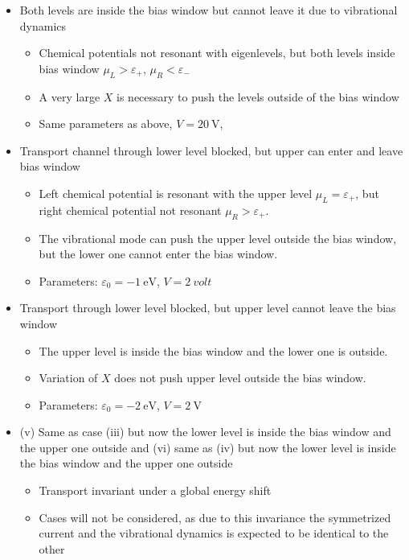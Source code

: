 \documentclass{article}
\begin{document}
\begin{itemize}
\begin{itemize}
\begin{itemize}
			\item Same parameters as above, $V=2t_0 = \SI{4}{\volt}$
		\end{itemize}  
		\item[(ii)] Both levels are inside the bias window but cannot leave it due to vibrational dynamics
		\begin{itemize}
			\item Chemical potentials not resonant with eigenlevels, but both levels inside bias window $\mu_L>\varepsilon_+$, $\mu_R< \varepsilon_-$
			\item A very large $X$ is necessary to push the levels outside of the bias window
			\item Same parameters as above, $V=\SI{20}{\volt}$,
		\end{itemize}
		\item[(iii)] Transport channel through lower level blocked, but upper can enter and leave bias window
		\begin{itemize}
			\item Left chemical potential is resonant with the upper level $\mu_L=\varepsilon_+$, but right chemical potential not resonant $\mu_R>\varepsilon_+$. 
			\item The vibrational mode can push the upper level outside the bias window, but the lower one cannot enter the bias window.
			\item Parameters: $\varepsilon_0 = -\SI{1}{\electronvolt}$, $V=\SI{2}{volt}$
		\end{itemize}
		\item[(iv)] Transport through lower level blocked, but upper level cannot leave the bias window 
		\begin{itemize}
			\item The upper level is inside the bias window and the lower one is outside.
			\item Variation of $X$ does not push upper level outside the bias window.
			\item Parameters: $\varepsilon_0 = -\SI{2}{\electronvolt}$, $V=\SI{2}{\volt}$
		\end{itemize}
		\item (v) Same as case (iii) but now the lower level is inside the bias window and the upper one outside and (vi) same as (iv) but now the lower level is inside the bias window and the upper one outside
		\begin{itemize}
			\item Transport invariant under a global energy shift
			\item Cases will not be considered, as due to this invariance the symmetrized current and the vibrational dynamics is expected to be identical to the other

\end{itemize}
\end{itemize}
\end{itemize}
\end{document}
